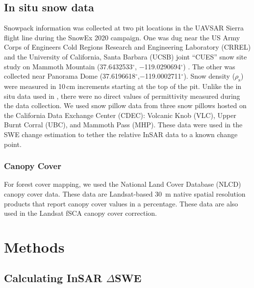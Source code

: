 \hypertarget{ch4-methods-8}{\subsection{In situ snow data}\label{ch4-methods-8}}

Snowpack information was collected at two pit locations in the UAVSAR Sierra flight line during the SnowEx 2020 campaign. One was dug near the US Army Corps of Engineers Cold Regions Research and Engineering Laboratory (CRREL) and the University of California, Santa Barbara (UCSB) joint “CUES” snow site study on Mammoth Mountain (37.6432533$^{\circ}$, $-$119.0290694$^{\circ}$) \citep{bairCUESStudySite2015}. The other was collected near Panorama Dome (37.6196618$^{\circ}$,$-$119.0002711$^{\circ}$). Snow density ($\rho_\mathrm{s}$) were measured in 10\,cm increments starting at the top of the pit. Unlike the in situ data used in \cite{tarriconeEstimatingSnowAccumulation2023a}, there were no direct values of permittivity measured during the data collection. We used snow pillow data from three snow pillows hosted on the California Data Exchange Center (CDEC): Volcanic Knob (VLC), Upper Burnt Corral (UBC), and Mammoth Pass (MHP). These data were used in the SWE change estimation to tether the relative InSAR data to a known change point.

\hypertarget{ch4-methods-9}{\subsubsection{Canopy Cover}\label{ch4-methods-9}}

For forest cover mapping, we used the National Land Cover Database (NLCD) \citep{homerConterminousUnitedStates2020} canopy cover data. These data are Landsat-based 30~m native spatial resolution products that report canopy cover values in a percentage. These data are also used in the Landsat fSCA canopy cover correction.

\hypertarget{ch4-methods}{\section{Methods}\label{ch4-methods}}
\hypertarget{ch4-methods-1}{\subsection{Calculating InSAR $\Delta$SWE}\label{ch4-methods-1}}


